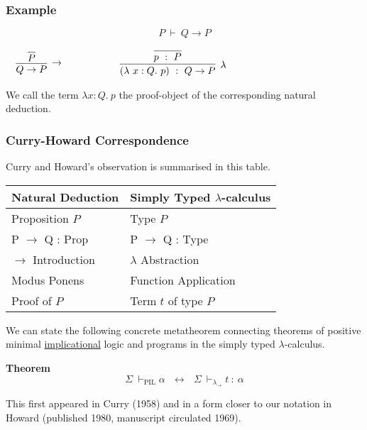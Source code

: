 \documentclass{beamer}
\theoremstyle{indentDefn} \newtheorem{defn}[]{Definition}
\begin{document}
\begin{frame}
  \frametitle{Example}

  $$P \ \vdash \ Q \to P$$

  \vspace{10mm}

  \begin{center}
    $\begin{array}{l c r}
      
      \begin{array}{c}
        \infer[\to]{Q \to P}
          {\infer[]{P}{}}
      \end{array}

      &
      \hspace{10mm}
      &
      
      \begin{array}{c}
        \infer[\lambda]{(\lambda \ x : Q. \ p) \ : \ Q \to P}
          {\infer[]{p \ : \ P}{}}
      \end{array}

    \end{array}$
  \end{center}

  \vspace{25mm}
  
  We call the term $\lambda x : Q. \ p$ the proof-object of the corresponding natural deduction.
\end{frame}

\begin{frame}
  \frametitle{Curry-Howard Correspondence}

  Curry and Howard's observation is summarised in this table.

  \begin{center}
    \begin{tabular}{l|l}
      Natural Deduction & Simply Typed $\lambda$-calculus \\
      \hline
      Proposition $P$ & Type $P$ \\
      P $\to$ Q : Prop & P $\to$ Q : Type \\
      $\to$ Introduction & $\lambda$ Abstraction\\
      Modus Ponens & Function Application \\
      Proof of $P$ & Term $t$ of type $P$
    \end{tabular}
  \end{center}

  We can state the following concrete metatheorem connecting theorems of positive minimal \underline{implicational} logic and programs in the simply typed $\lambda$-calculus.

  {\bf Theorem}$$ \Sigma \ \vdash_{\text{PIL}} \alpha \ \ \ \leftrightarrow \ \ \ \Sigma \ \vdash_{\lambda_{\to}} t \ : \ \alpha$$

  This first appeared in Curry (1958) and in a form closer to our notation in Howard (published 1980, manuscript circulated 1969).
\end{frame}
\end{document}
